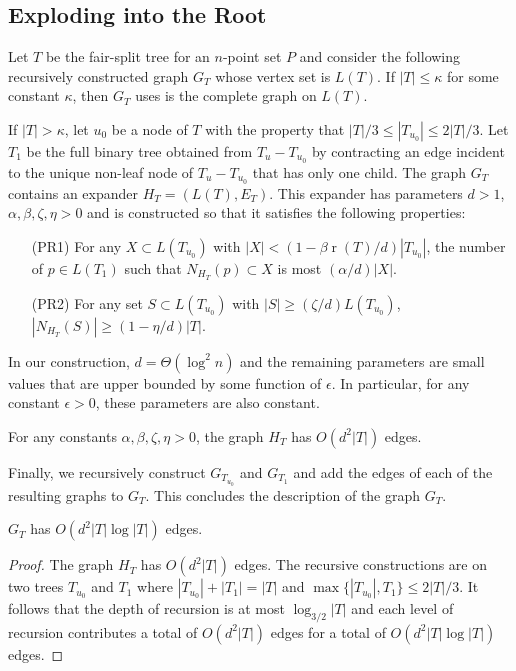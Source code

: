 \documentclass{patmorin}
\DeclareMathOperator{\rank}{r}
\begin{document}
\subsection{Exploding into the Root}

Let $T$ be the fair-split tree for an $n$-point set $P$ and consider
the following recursively constructed graph $G_{T}$ whose vertex set
is $L(T)$.  If $|T| \le \kappa$ for some constant $\kappa$, then $G_T$ uses is the complete graph on $L(T)$.  

If $|T|>\kappa$, let $u_0$ be a node of $T$ with the property that
$|T|/3\le |T_{u_0}|\le 2|T|/3$.  Let $T_1$ be the full binary tree
obtained from $T_u-T_{u_0}$ by contracting an edge incident to the unique
non-leaf node of $T_u-T_{u_0}$ that has only one child.  The graph $G_{T}$
contains an expander $H_T=(L(T),E_T)$. This expander has parameters $d>1$,
$\alpha, \beta,\zeta,\eta > 0$ and is constructed so that it satisfies
the following properties:
\begin{enumerate}
	\item[(PR1)] For any $X\subset L(T_{u_0})$ with
  $|X|<(1-\beta\rank(T)/d)|T_{u_0}|$, the number of $p\in L(T_1)$ such
  that $N_{H_T}(p)\subset X$ is most $(\alpha/d)|X|$.

   \item[(PR2)] For any set $S\subset L(T_{u_0})$ with $|S|\ge (\zeta/d)L(T_{u_0})$, $|N_{H_T}(S)|\ge (1-\eta/d)|T|$.
\end{enumerate}
In our construction, $d=\Theta(\log^2 n)$ and the remaining parameters
are small values that are upper bounded by some function of $\epsilon$. In particular, for any constant $\epsilon >0$, these parameters are also constant.

\begin{clm}
	For any constants $\alpha,\beta,\zeta,\eta>0$, the graph $H_T$ has 
	$O(d^2|T|)$ edges.
\end{clm}

Finally, we recursively construct $G_{T_{u_0}}$ and $G_{T_1}$ and add the
edges of each of the resulting graphs to $G_{T}$. This concludes the description of the graph $G_T$.

\begin{clm}
  $G_{T}$ has $O(d^2|T|\log |T|)$ edges.
\end{clm}

\begin{proof}
  The graph $H_T$ has
  $O(d^2|T|)$ edges.  The recursive constructions are on two trees $T_{u_0}$
  and $T_1$ where $|T_{u_0}|+|T_1|=|T|$ and $\max\{|T_{u_0}|,T_1\}\le
  2|T|/3$. It follows that the depth of recursion is at most
  $\log_{3/2}|T|$ and each level of recursion contributes a total of
  $O(d^2|T|)$ edges for a total of $O(d^2|T|\log|T|)$ edges.
\end{proof}
\end{document}
